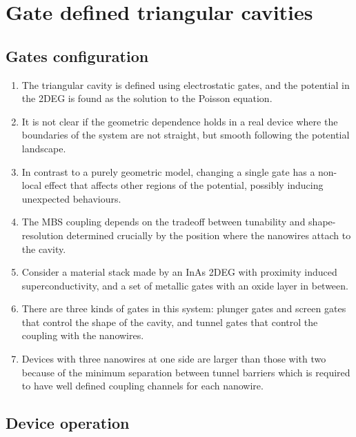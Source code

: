 \chapter{Gate defined triangular cavities}

\section{Gates configuration}
\begin{enumerate}
\item The triangular cavity is defined using electrostatic gates, and the potential in the 2DEG is found as the solution to the Poisson equation.
\item It is not clear if the geometric dependence holds in a real device where the boundaries of the system are not straight, but smooth following the potential landscape.
\item In contrast to a purely geometric model, changing a single gate has a non-local effect that affects other regions of the potential, possibly inducing unexpected behaviours.
\item The MBS coupling depends on the tradeoff between tunability and shape-resolution determined crucially by the position where the nanowires attach to the cavity.
\item Consider a material stack made by an InAs 2DEG with proximity induced superconductivity, and a set of metallic gates with an oxide layer in between.
\item There are three kinds of gates in this system: plunger gates and screen gates that control the shape of the cavity, and tunnel gates that control the coupling with the nanowires.
\item Devices with three nanowires at one side are larger than those with two because of the minimum separation between tunnel barriers which is required to have well defined coupling channels for each nanowire.
\end{enumerate}

\section{Device operation}
